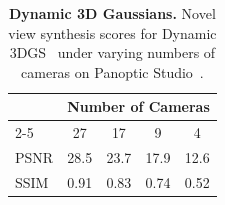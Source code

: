 \begin{table}[t]
\setlength{\tabcolsep}{4pt}
\centering
\caption{\textbf{Dynamic 3D Gaussians.} Novel view synthesis scores for Dynamic 3DGS~\cite{luiten2023dynamic} under varying numbers of cameras on Panoptic Studio~\cite{koppula2024tapvid}.}
\vspace{-0.3cm}
\begin{tabular}{lcccc}
\toprule
 & \multicolumn{4}{c}{Number of Cameras} \\
\cmidrule(lr){2-5}
 & 27 & 17 & 9 & 4 \\
\midrule
PSNR & 28.5 & 23.7 & 17.9 & 12.6 \\
SSIM & 0.91 & 0.83 & 0.74 & 0.52 \\
\bottomrule
\end{tabular}
\label{tab:d3dgs-vary-number-of-views}
\end{table}
